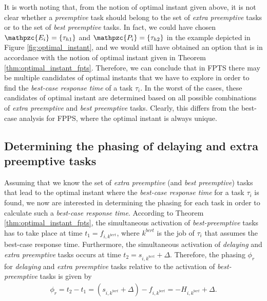 \documentclass[fleqn]{article}
\begin{document}
It is worth noting that, from the notion of optimal instant given above, it is not clear whether a \textit{preemptive} task should belong to the set of \textit{extra preemptive} tasks or to the set of \textit{best preemptive} tasks. In fact, we could have chosen $\mathpzc{E_i}=\{\tau_{h1}\}$ and $\mathpzc{P_i}=\{\tau_{h2}\}$ in the example depicted in Figure \ref{fig:optimal_instant}, and we would still have obtained an option that is in accordance with the notion of optimal instant given in Theorem \ref{thm:optimal_instant_fpts}. Therefore, we can conclude that in FPTS there may be multiple candidates of optimal instants that we have to explore in order to find the \textit{best-case response time} of a task $\tau_i$. In the worst of the cases, these candidates of optimal instant are determined based on all possible combinations of \textit{extra preemptive} and \textit{best preemptive} tasks. Clearly, this differs from the best-case analysis for FPPS, where the optimal instant is always unique.



\subsection{Determining the phasing of delaying and extra preemptive tasks}
Assuming that we know the set of \textit{extra preemptive} (and \textit{best preemptive}) tasks that lead to the optimal instant where the \textit{best-case response time} for a task $\tau_i$ is found, we now are interested in determining the phasing for each task in order to calculate such a \textit{best-case response time}. According to Theorem \ref{thm:optimal_instant_fpts}, the simultaneous activation of \textit{best-preemptive} tasks has to take place at time $t_1=f_{i,k^{bcrt}}$, where $k^{bcrt}$ is the job of $\tau_i$ that assumes the best-case response time. Furthermore, the simultaneous activation of \textit{delaying} and \textit{extra preemptive} tasks occurs at time $t_2=s_{i,k^{bcrt}}+\Delta$. Therefore, the phasing $\phi_r$ for \textit{delaying} and \textit{extra preemptive} tasks relative to the activation of \textit{best-preemptive} tasks is given by
\begin{align*}
	\phi_r = t_2 - t_1 = (s_{i,k^{bcrt}}+\Delta) - f_{i,k^{bcrt}} = -H_{i,k^{bcrt}}+\Delta.
\end{align*}
\end{document}
